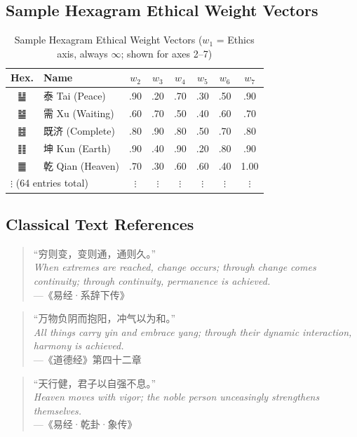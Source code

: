 \documentclass[conference]{IEEEtran}
\begin{document}
\subsection{Sample Hexagram Ethical Weight Vectors}

\begin{table}[!ht]
\caption{Sample Hexagram Ethical Weight Vectors
($w_1$ = Ethics axis, always $\infty$;
shown for axes 2--7)}
\label{tab:hexmap}
\centering
\small
\begin{tabular}{clcccccc}
\toprule
\textbf{Hex.} & \textbf{Name}
  & $w_2$ & $w_3$ & $w_4$ & $w_5$ & $w_6$ & $w_7$ \\
\midrule
䷊ & 泰 Tai (Peace)
  & .90 & .20 & .70 & .30 & .50 & .90 \\
䷄ & 需 Xu (Waiting)
  & .60 & .70 & .50 & .40 & .60 & .70 \\
䷾ & 既济 (Complete)
  & .80 & .90 & .80 & .50 & .70 & .80 \\
䷁ & 坤 Kun (Earth)
  & .90 & .40 & .90 & .20 & .80 & .90 \\
䷀ & 乾 Qian (Heaven)
  & .70 & .30 & .60 & .60 & .40 & 1.00 \\
\midrule
\multicolumn{2}{l}{$\vdots$ (64 entries total)}
  & $\vdots$ & $\vdots$ & $\vdots$
  & $\vdots$ & $\vdots$ & $\vdots$ \\
\bottomrule
\end{tabular}
\end{table}

\subsection{Classical Text References}

\begin{quote}
``穷则变，变则通，通则久。''\\
\textit{When extremes are reached, change occurs;
through change comes continuity; through continuity,
permanence is achieved.}\\
\hfill---《易经·系辞下传》
\end{quote}

\begin{quote}
``万物负阴而抱阳，冲气以为和。''\\
\textit{All things carry yin and embrace yang;
through their dynamic interaction, harmony is achieved.}\\
\hfill---《道德经》第四十二章
\end{quote}

\begin{quote}
``天行健，君子以自强不息。''\\
\textit{Heaven moves with vigor; the noble person
unceasingly strengthens themselves.}\\
\hfill---《易经·乾卦·象传》
\end{quote}
\end{document}
